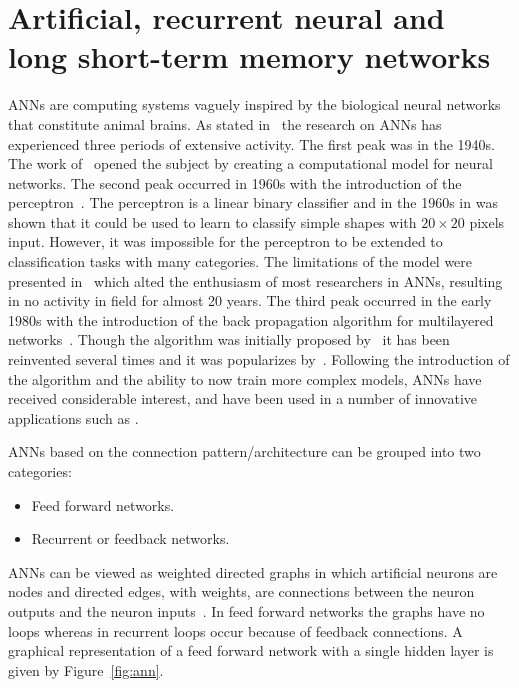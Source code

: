 \section{Artificial, recurrent neural and long short-term memory networks}\label{section:artificial_neural_networks}

ANNs are computing systems vaguely inspired by the biological neural networks
that constitute animal brains. As stated in~\cite{Jain1996} the research on ANNs
has experienced three periods of extensive activity. The first peak was in the
1940s. The work of~\cite{McCulloch1943} opened the subject by creating a
computational model for neural networks. The second peak occurred in 1960s with
the introduction of the perceptron~\cite{Rosenblatt1958}. The perceptron is a
linear binary classifier and in the 1960s in was shown that it could be used to
learn to classify simple shapes with \(20\times20\) pixels input. However, it
was impossible for the perceptron to be extended to classification tasks with
many categories. The limitations of the model were presented
in~\cite{Minsky1969} which alted the enthusiasm of most researchers in ANNs,
resulting in no activity in field for almost 20 years. The third peak occurred
in the early 1980s with the introduction of the back propagation algorithm for
multilayered networks~\cite{Werbos1974}. Though the algorithm was initially
proposed by~\cite{Werbos1974} it has been reinvented several times and it was
popularizes by~\cite{McClelland1986}. Following the introduction of the
algorithm and the ability to now train more complex models, ANNs have received
considerable interest, and have been used in a number of innovative applications
such as \cite{Covington2016, Kalogirou2000}.

ANNs based on the connection pattern/architecture can be grouped into two
categories:

\begin{itemize}
    \item Feed forward networks.
    \item Recurrent or feedback networks.
\end{itemize}

ANNs can be viewed as weighted directed graphs in which artificial neurons are
nodes and directed edges, with weights, are connections between the neuron
outputs and the neuron inputs~\cite{Jain1996}. In feed forward networks the
graphs have no loops whereas in recurrent loops occur because of feedback
connections. A graphical representation of a feed forward network with a single
hidden layer is given by Figure~\ref{fig:ann}.

